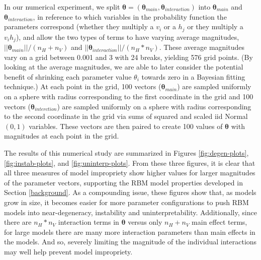 \documentclass[]{article}
\theoremstyle{definition}
\newcommand{\nv}{{n_{\scriptscriptstyle V}}}
\newcommand{\nh}{{n_{\scriptscriptstyle H}}}
\begin{document}
In our numerical experiment, we split
\(\boldsymbol \theta = (\boldsymbol \theta_{main}, \boldsymbol \theta_{interaction})\)
into \(\boldsymbol \theta_{main}\) and
\(\boldsymbol \theta_{interaction}\), in reference to which variables in
the probability function the parameters correspond (whether they
multiply a \(v_i\) or a \(h_j\) or they multiply a \(v_i h_j\)), and
allow the two types of terms to have varying average magnitudes,
\(||\boldsymbol \theta_{main} || /(\nh+\nv)\) and
\(||\boldsymbol \theta_{interaction} || /(\nh*\nv)\). These average
magnitudes vary on a grid between 0.001 and 3 with 24 breaks, yielding
576 grid points. (By looking at the average magnitudes, we are able to
later consider the potential benefit of shrinking each parameter value
\(\theta_i\) towards zero in a Bayesian fitting technique.) At each
point in the grid, 100 vectors (\(\boldsymbol \theta_{main}\)) are
sampled uniformly on a sphere with radius corresponding to the first
coordinate in the grid and 100 vectors
(\(\boldsymbol \theta_{interction}\)) are sampled uniformly on a sphere
with radius corresponding to the second coordinate in the grid via sums
of squared and scaled iid Normal\((0, 1)\) variables. These vectors are
then paired to create 100 values of \(\boldsymbol \theta\) with
magnitudes at each point in the grid.

The results of this numerical study are summarized in Figures
\ref{fig:degen-plots}, \ref{fig:instab-plots}, and
\ref{fig:uninterp-plots}. From these three figures, it is clear that all
three measures of model impropriety show higher values for larger
magnitudes of the parameter vectors, supporting the RBM model properties
developed in Section \ref{background}. As a compounding issue, these
figures show that, as models grow in size, it becomes easier for more
parameter configurations to push RBM models into near-degeneracy,
instability and uninterpretability. Additionally, since there are
\(\nh*\nv\) interaction terms in \(\boldsymbol \theta\) versus only
\(\nh + \nv\) main effect terms, for large models there are many more
interaction parameters than main effects in the models. And so, severely
limiting the magnitude of the individual interactions may well help
prevent model impropriety.
\end{document}
